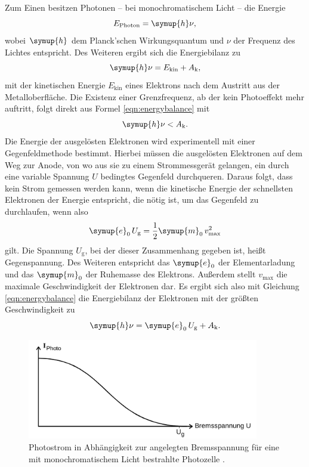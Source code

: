Zum Einen besitzen Photonen -- bei monochromatischem Licht -- die Energie
\begin{equation}
	E_{\mathrm{Photon}} = \symup{h} \nu \mathrm{,}
\end{equation}
wobei $\symup{h}$ dem Planck'schen Wirkungsquantum und $\nu$ der Frequenz des Lichtes
entspricht.
Des Weiteren ergibt sich die Energiebilanz zu
\begin{equation}
	\label{eqn:energybalance}
	\symup{h} \nu = E_{\mathrm{kin}} + A_{\mathrm{k}} \mathrm{,}
\end{equation}
mit der kinetischen Energie $E_{\mathrm{kin}}$ eines Elektrons nach dem Austritt aus der
Metalloberfläche.
Die Existenz einer Grenzfrequenz, ab der kein Photoeffekt mehr auftritt, folgt direkt aus
Formel \eqref{eqn:energybalance} mit
\begin{equation*}
	\symup{h} \nu < A_{\mathrm{k}} \mathrm{.}
\end{equation*}
Die Energie der ausgelösten Elektronen wird experimentell mit einer Gegenfeldmethode bestimmt.
Hierbei müssen die ausgelösten Elektronen auf dem Weg zur Anode, von wo aus sie zu einem
Strommessgerät gelangen, ein durch eine variable Spannung $U$ bedingtes Gegenfeld
durchqueren. Daraus folgt, dass kein Strom gemessen werden kann, wenn die kinetische Energie
der schnellsten Elektronen der Energie entspricht, die nötig ist, um das Gegenfeld zu
durchlaufen, wenn also
\begin{equation}
	\symup{e}_0 \, U_{\mathrm{g}} = \frac{1}{2} \symup{m}_0 \, v_{\mathrm{max}}^2
\end{equation}
gilt. Die Spannung $U_{\mathrm{g}}$, bei der dieser Zusammenhang gegeben ist, heißt
Gegenspannung. Des Weiteren entspricht das $\symup{e}_0$ der Elementarladung und das
$\symup{m}_0$ der Ruhemasse des Elektrons. Außerdem stellt $v_{\mathrm{max}}$ die maximale
Geschwindigkeit der Elektronen dar.
Es ergibt sich also mit Gleichung \eqref{eqn:energybalance} die Energiebilanz der Elektronen
mit der größten Geschwindigkeit zu
\begin{equation}
	\label{eqn:gleichi}
	\symup{h} \nu = \symup{e}_0 \, U_{\mathrm{g}} + A_{\mathrm{k}} \mathrm{.}
\end{equation}

\begin{figure}
  \centering
  \includegraphics[width=0.90\textwidth]{Bilder/verlauf_photostrom.png}
  \caption{Photostrom in Abhängigkeit zur angelegten Bremsspannung für eine mit monochromatischem Licht bestrahlte Photozelle \cite{Anleitung}.}
  \label{fig:fermidirac}
\end{figure}

